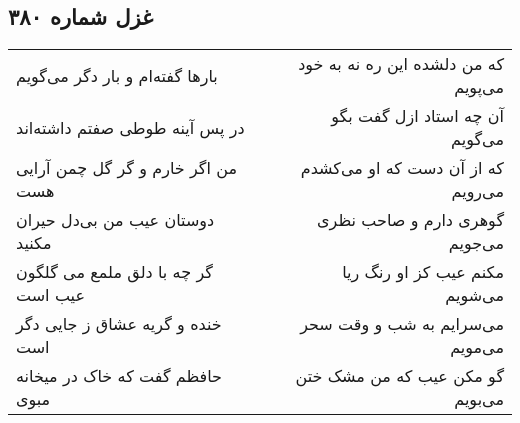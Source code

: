 \begin{center}
\section*{غزل شماره ۳۸۰}
\label{sec:sh380}
\begin{longtable}{l p{0.5cm} r}
بارها گفته‌ام و بار دگر می‌گویم
&&
که من دلشده این ره نه به خود می‌پویم
\\
در پس آینه طوطی صفتم داشته‌اند
&&
آن چه استاد ازل گفت بگو می‌گویم
\\
من اگر خارم و گر گل چمن آرایی هست
&&
که از آن دست که او می‌کشدم می‌رویم
\\
دوستان عیب من بی‌دل حیران مکنید
&&
گوهری دارم و صاحب نظری می‌جویم
\\
گر چه با دلق ملمع می گلگون عیب است
&&
مکنم عیب کز او رنگ ریا می‌شویم
\\
خنده و گریه عشاق ز جایی دگر است
&&
می‌سرایم به شب و وقت سحر می‌مویم
\\
حافظم گفت که خاک در میخانه مبوی
&&
گو مکن عیب که من مشک ختن می‌بویم
\\
\end{longtable}
\end{center}
